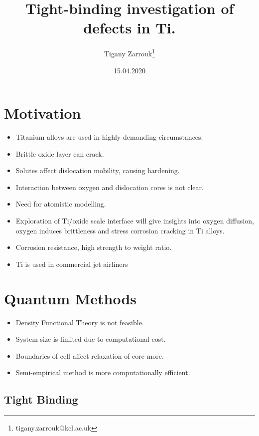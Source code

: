 \documentclass[11pt]{article}
\author{Tigany Zarrouk\thanks{tigany.zarrouk@kcl.ac.uk}}
\date{15.04.2020}
\title{Tight-binding investigation of defects in Ti.}
\begin{document}
\maketitle


\section*{Motivation}
\label{sec:org028837a}
\begin{itemize}
\item Titanium alloys are used in highly demanding circumstances.
\item Brittle oxide layer can crack.
\item Solutes affect dislocation mobility, causing hardening.
\item Interaction between oxygen and dislocation cores is not clear.
\item Need for atomistic modelling.
\item Exploration of Ti/oxide scale interface will give insights into oxygen
diffusion, oxygen induces brittleness and stress corrosion cracking in Ti
alloys.
\end{itemize}
\begin{NOTES}
\begin{itemize}
\item Corrosion resistance, high strength to weight ratio.
\item Ti is used in commercial jet airliners
\end{itemize}
\end{NOTES}


\section*{Quantum Methods}
\label{sec:org4ebdaa8}
\begin{itemize}
\item Density Functional Theory is not feasible.
\item System size is limited due to computational cost.
\item Boundaries of cell affect relaxation of core more.
\item Semi-empirical method is more computationally efficient.
\end{itemize}

\subsection*{Tight Binding}
\label{sec:org36f8108}
\end{document}
